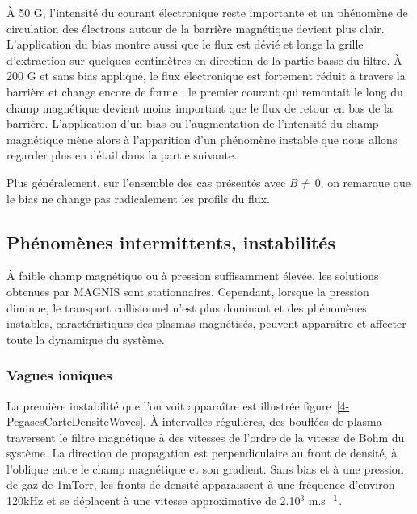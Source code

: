 \begin{refsection}
À 50 G, l'intensité du courant électronique reste importante et un phénomène de
circulation des électrons autour de la barrière magnétique devient plus clair.
L'application du bias montre aussi que le flux est dévié et longe la grille
d'extraction sur quelques centimètres en direction de la partie basse du filtre.
À 200 G et sans bias appliqué, le flux électronique est fortement réduit à travers la barrière et change encore de
forme : le premier courant qui remontait le long du champ magnétique devient
moins important que le flux de retour en bas de la barrière. L'application d'un
bias ou l'augmentation de l'intensité du champ magnétique mène alors à
l'apparition d'un phénomène instable que nous allons regarder plus en détail dans la partie suivante.

Plus généralement, sur l'ensemble des cas présentés avec $B\neq\,$0, on remarque
que le bias ne change pas radicalement les profils du flux.

\subsection{Phénomènes intermittents, instabilités}
À faible champ magnétique ou à pression suffisamment élevée, les solutions
obtenues par MAGNIS sont stationnaires.
Cependant, lorsque la pression diminue, le transport collisionnel n'est plus
dominant et des phénomènes instables, caractéristiques des plasmas
magnétisés, peuvent apparaître et affecter toute la dynamique du système. 
 
\subsubsection{Vagues ioniques}
La première instabilité que l'on voit apparaître est illustrée
figure~\ref{4-PegasesCarteDensiteWaves}. À intervalles régulières, des bouffées
de plasma traversent le filtre magnétique à des vitesses de l'ordre de la
vitesse de Bohm du système.
La direction de propagation est perpendiculaire au front de densité, à l'oblique entre le champ magnétique et son gradient. Sans bias et à une pression de gaz de 1mTorr,
 les fronts de densité apparaissent à une fréquence d'environ 120kHz et se
 déplacent à une vitesse approximative de 2.10$^3$ m.s$^{{-1}}$. 
 

\end{refsection}
